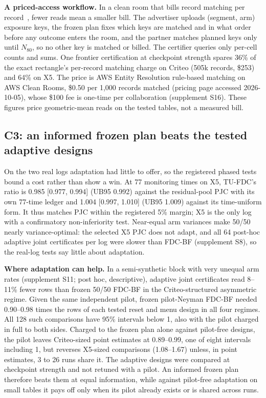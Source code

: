 \documentclass[sigconf,anonymous,review]{acmart}
\begin{document}
\textbf{A priced-access workflow.} In a clean room that bills record matching per record~\citep{awscleanrooms2026pricing}, fewer reads mean a smaller bill. The advertiser uploads (segment, arm) exposure keys, the frozen plan fixes which keys are matched and in what order before any outcome enters the room, and the partner matches planned keys only until $N_{80}$, so no other key is matched or billed. The certifier queries only per-cell counts and sums. One frontier certification at checkpoint strength spares 36\% of the exact rectangle's per-record matching charge on Criteo (505k records, \$253) and 64\% on X5. The price is AWS Entity Resolution rule-based matching on AWS Clean Rooms, \$0.50 per 1,000 records matched (pricing page accessed 2026-10-05), whose \$100 fee is one-time per collaboration (supplement S16). These figures price geometric-mean reads on the tested tables, not a measured bill.

\subsection{C3: an informed frozen plan beats the tested adaptive designs}\label{sec:c3}

On the two real logs adaptation had little to offer, so the registered phased tests bound a cost rather than show a win. At 77 monitoring times on X5, TU-FDC's ratio is 0.985 [0.977, 0.994] (UB95 0.992) against the residual-pool PJC with its own 77-time ledger and 1.004 [0.997, 1.010] (UB95 1.009) against its time-uniform form. It thus matches PJC within the registered 5\% margin; X5 is the only log with a confirmatory non-inferiority test. Near-equal arm variances make 50/50 nearly variance-optimal: the selected X5 PJC does not adapt, and all 64 post-hoc adaptive joint certificates per log were slower than FDC-BF (supplement S8), so the real-log tests say little about adaptation.

\textbf{Where adaptation can help.} In a semi-synthetic block with very unequal arm rates (supplement S11; post hoc, descriptive), adaptive joint certificates read 8--11\% fewer rows than frozen 50/50 FDC-BF in the Criteo-structured asymmetric regime. Given the same independent pilot, frozen pilot-Neyman FDC-BF needed 0.90--0.98 times the rows of each tested reset and menu design in all four regimes. All 128 such comparisons have 95\% intervals below 1, also with the pilot charged in full to both sides. Charged to the frozen plan alone against pilot-free designs, the pilot leaves Criteo-sized point estimates at 0.89--0.99, one of eight intervals including 1, but reverses X5-sized comparisons (1.08--1.67) unless, in point estimates, 3 to 26 runs share it. The adaptive designs were compared at checkpoint strength and not retuned with a pilot. An informed frozen plan therefore beats them at equal information, while against pilot-free adaptation on small tables it pays off only when its pilot already exists or is shared across runs.
\end{document}
